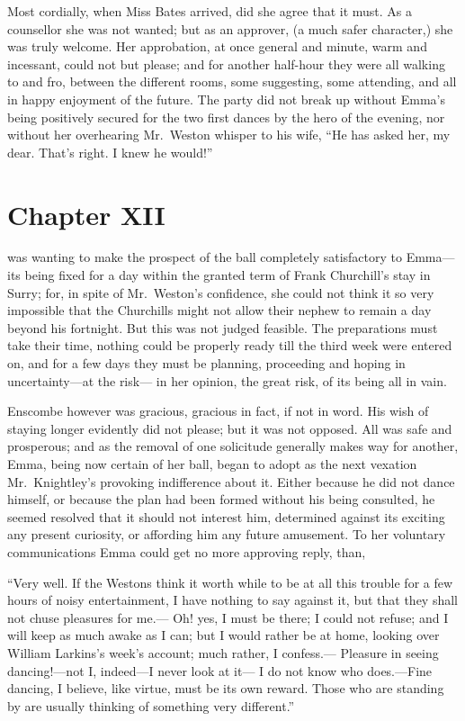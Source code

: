 Most cordially, when Miss Bates arrived, did she agree that it must.
As a counsellor she was not wanted; but as an approver, (a much
safer character,) she was truly welcome.  Her approbation, at once
general and minute, warm and incessant, could not but please;
and for another half-hour they were all walking to and fro,
between the different rooms, some suggesting, some attending,
and all in happy enjoyment of the future.  The party did not break
up without Emma's being positively secured for the two first dances
by the hero of the evening, nor without her overhearing Mr.\ Weston
whisper to his wife, ``He has asked her, my dear.  That's right.
I knew he would!''



\chapter{Chapter XII}


 was wanting to make the prospect of the ball
completely satisfactory to Emma---its being fixed for a day within
the granted term of Frank Churchill's stay in Surry; for, in spite
of Mr.\ Weston's confidence, she could not think it so very impossible
that the Churchills might not allow their nephew to remain
a day beyond his fortnight.  But this was not judged feasible.
The preparations must take their time, nothing could be properly
ready till the third week were entered on, and for a few days they
must be planning, proceeding and hoping in uncertainty---at the risk---%
in her opinion, the great risk, of its being all in vain.

Enscombe however was gracious, gracious in fact, if not in word.
His wish of staying longer evidently did not please; but it was
not opposed.  All was safe and prosperous; and as the removal of one
solicitude generally makes way for another, Emma, being now certain
of her ball, began to adopt as the next vexation Mr.\ Knightley's
provoking indifference about it.  Either because he did not
dance himself, or because the plan had been formed without his
being consulted, he seemed resolved that it should not interest him,
determined against its exciting any present curiosity, or affording
him any future amusement.  To her voluntary communications Emma
could get no more approving reply, than,

``Very well.  If the Westons think it worth while to be at all this
trouble for a few hours of noisy entertainment, I have nothing
to say against it, but that they shall not chuse pleasures for me.---%
Oh! yes, I must be there; I could not refuse; and I will keep
as much awake as I can; but I would rather be at home, looking over
William Larkins's week's account; much rather, I confess.---%
Pleasure in seeing dancing!---not I, indeed---I never look at it---%
I do not know who does.---Fine dancing, I believe, like virtue,
must be its own reward.  Those who are standing by are usually
thinking of something very different.''

